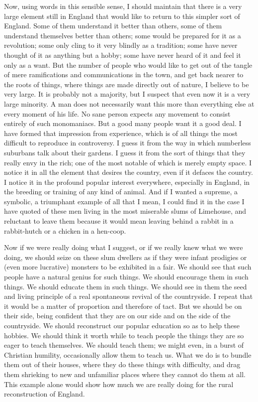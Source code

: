 \documentclass{book}
\begin{document}
Now, using words in this sensible sense, I should maintain that there is a very large element still in England that would like to return to this simpler sort of England. Some of them understand it better than others, some of them understand themselves better than others; some would be prepared for it as a revolution; some only cling to it very blindly as a tradition; some have never thought of it as anything but a hobby; some have never heard of it and feel it only as a want. But the number of people who would like to get out of the tangle of mere ramifications and communications in the town, and get back nearer to the roots of things, where things are made directly out of nature, I believe to be very large. It is probably not a majority, but I suspect that even now it is a very large minority. A man does not necessarily want this more than everything else at every moment of his life. No sane person expects any movement to consist entirely of such monomaniacs. But a good many people want it a good deal. I have formed that impression from experience, which is of all things the most difficult to reproduce in controversy. I guess it from the way in which numberless suburbans talk about their gardens. I guess it from the sort of things that they really envy in the rich; one of the most notable of which is merely empty space. I notice it in all the element that desires the country, even if it defaces the country. I notice it in the profound popular interest everywhere, especially in England, in the breeding or training of any kind of animal. And if I wanted a supreme, a symbolic, a triumphant example of all that I mean, I could find it in the case I have quoted of these men living in the most miserable slums of Limehouse, and reluctant to leave them because it would mean leaving behind a rabbit in a rabbit-hutch or a chicken in a hen-coop.

Now if we were really doing what I suggest, or if we really knew what we were doing, we should seize on these slum dwellers as if they were infant prodigies or (even more lucrative) monsters to be exhibited in a fair. We should see that such people have a natural genius for such things. We should encourage them in such things. We should educate them in such things. We should see in them the seed and living principle of a real spontaneous revival of the countryside. I repeat that it would be a matter of proportion and therefore of tact. But we should be on their side, being confident that they are on our side and on the side of the countryside. We should reconstruct our popular education so as to help these hobbies. We should think it worth while to teach people the things they are so eager to teach themselves. We should teach them; we might even, in a burst of Christian humility, occasionally allow them to teach us. What we do is to bundle them out of their houses, where they do these things with difficulty, and drag them shrieking to new and unfamiliar places where they cannot do them at all. This example alone would show how much we are really doing for the rural reconstruction of England.
\end{document}
